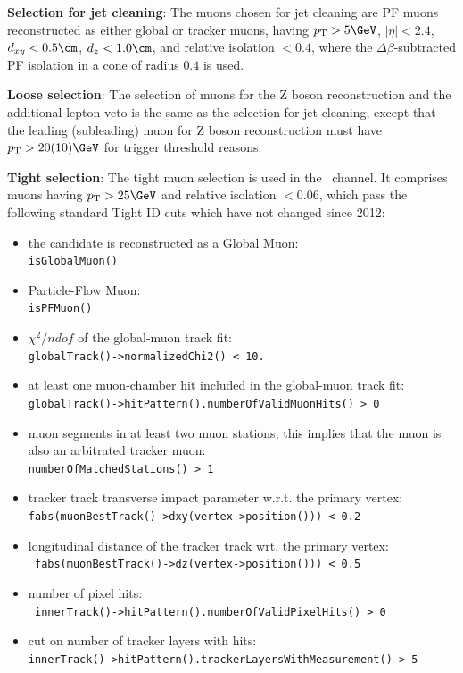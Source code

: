   \textbf{Selection for jet cleaning}:
  The muons chosen for jet cleaning are PF muons reconstructed as either global or tracker muons, having $\pt>5\GeV$, $|\eta|<2.4$, $d_{xy}<0.5\cm$, $d_z<1.0\cm$, and
  relative isolation $< 0.4$, where the $\Delta\beta$-subtracted PF isolation in a cone of radius $0.4$ is used.

  \textbf{Loose selection}:
  The selection of muons for the Z boson reconstruction and the additional lepton veto is the same as
  the selection for jet cleaning, except that the leading (subleading) muon for Z boson
  reconstruction must have $\pt > 20 (10)\GeV$ for trigger threshold reasons.

  \textbf{Tight selection}:
  The tight muon selection is used in the \WmnH\ channel.
  It comprises muons having $\pt > 25\GeV$ and relative isolation $< 0.06$,
  which pass the following standard Tight ID cuts which have not changed since 2012:
 \begin{itemize}
  \item the candidate is reconstructed as a Global Muon:\\
  \texttt{isGlobalMuon()}
  \item Particle-Flow Muon:\\
  \texttt{isPFMuon()}
  \item $\chi^2/ndof$ of the global-muon track fit:\\
   \texttt{globalTrack()->normalizedChi2() < 10.}
  \item at least one muon-chamber hit included in the global-muon track fit:\\
  \texttt{globalTrack()->hitPattern().numberOfValidMuonHits() > 0 }
  \item muon segments in at least two muon stations; this implies that the muon is also an arbitrated tracker muon:\\
  \texttt{numberOfMatchedStations() > 1 }
  \item tracker track transverse impact parameter w.r.t. the primary vertex:\\
  \texttt{fabs(muonBestTrack()->dxy(vertex->position())) < 0.2 }
  \item longitudinal distance of the tracker track wrt. the primary vertex:\\
  \texttt{ fabs(muonBestTrack()->dz(vertex->position())) < 0.5 }
  \item number of pixel hits:\\
  \texttt{ innerTrack()->hitPattern().numberOfValidPixelHits() > 0 }
  \item cut on number of tracker layers with hits:\\
  \texttt{innerTrack()->hitPattern().trackerLayersWithMeasurement() > 5}
 \end{itemize}
  
